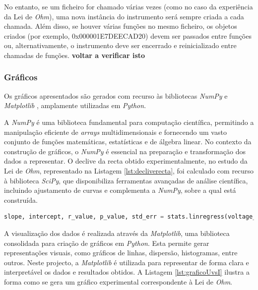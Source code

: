 No entanto, se um ficheiro for chamado várias vezes (como no caso da experiência da Lei de \textit{Ohm}), uma nova instância do instrumento será sempre criada a cada chamada. Além disso, se houver várias funções no mesmo ficheiro, os objetos criados (por exemplo, 0x000001E7DEECAD20) devem ser passados entre funções ou, alternativamente, o instrumento deve ser encerrado e reinicializado entre chamadas de funções. \textbf{voltar a verificar isto}

\subsubsection{Gráficos}
\label{sec:graficos}
Os gráficos apresentados são gerados com recurso às bibliotecas \textit{NumPy} \cite{NumPy} e \textit{Matplotlib} \cite{Matplotlib}, amplamente utilizadas em \textit{Python}. 

A \textit{NumPy} é uma biblioteca fundamental para computação científica, permitindo a manipulação eficiente de \textit{arrays} multidimensionais e fornecendo um vasto conjunto de funções matemáticas, estatísticas e de álgebra linear. No contexto da construção de gráficos, o \textit{NumPy} é essencial na preparação e transformação dos dados a representar. O declive da recta obtido experimentalmente, no estudo da Lei de \textit{Ohm}, representado na Listagem \ref{lst:decliverecta}, foi calculado com recurso à biblioteca \textit{SciPy}, que disponibiliza ferramentas avançadas de análise científica, incluindo ajustamento de curvas e complementa a \textit{NumPy}, sobre a qual está construída.

\begin{minipage}{0.9\linewidth}
	\begin{lstlisting}[language=Python,escapechar=|, caption=Cálculo do declive da recta, label=lst:decliverecta]
		slope, intercept, r_value, p_value, std_err = stats.linregress(voltage_measurements, current_measurements)
	\end{lstlisting}
\end{minipage}

A visualização dos dados é realizada através da \textit{Matplotlib}, uma biblioteca consolidada para criação de gráficos em \textit{Python}. Esta permite gerar representações visuais, como gráficos de linhas, dispersão, histogramas, entre outros. Neste projecto, a \textit{Matplotlib} é utilizada para representar de forma clara e interpretável os dados e resultados obtidos. A Listagem \ref{lst:graficoUvsI} ilustra a forma como se gera um gráfico experimental correspondente à Lei de \textit{Ohm}.

